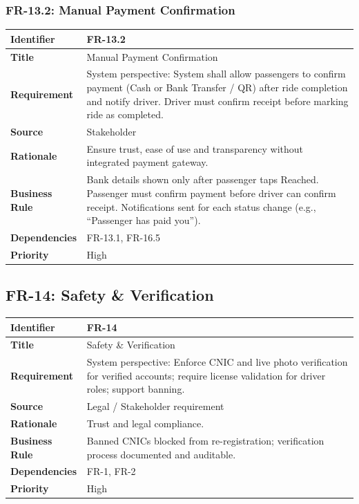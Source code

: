\subsubsection{FR-13.2: Manual Payment Confirmation}

\begin{longtable}{|p{3cm}|p{12cm}|}
\hline
\rowcolor{lightgray!30}
\textbf{Identifier} & FR-13.2 \\
\hline
\textbf{Title} & Manual Payment Confirmation \\
\hline
\textbf{Requirement} & System perspective: System shall allow passengers to confirm payment (Cash or Bank Transfer / QR) after ride completion and notify driver. Driver must confirm receipt before marking ride as completed. \\
\hline
\textbf{Source} & Stakeholder \\
\hline
\textbf{Rationale} & Ensure trust, ease of use and transparency without integrated payment gateway. \\
\hline
\textbf{Business Rule} & Bank details shown only after passenger taps Reached. Passenger must confirm payment before driver can confirm receipt. Notifications sent for each status change (e.g., “Passenger has paid you”). \\
\hline
\textbf{Dependencies} & FR-13.1, FR-16.5 \\
\hline
\textbf{Priority} & High \\
\hline
\end{longtable}

\subsection{FR-14: Safety \& Verification}

\begin{longtable}{|p{3cm}|p{12cm}|}
\hline
\rowcolor{lightgray!30}
\textbf{Identifier} & FR-14 \\
\hline
\textbf{Title} & Safety \& Verification \\
\hline
\textbf{Requirement} & System perspective: Enforce CNIC and live photo verification for verified accounts; require license validation for driver roles; support banning. \\
\hline
\textbf{Source} & Legal / Stakeholder requirement \\
\hline
\textbf{Rationale} & Trust and legal compliance. \\
\hline
\textbf{Business Rule} & Banned CNICs blocked from re-registration; verification process documented and auditable. \\
\hline
\textbf{Dependencies} & FR-1, FR-2 \\
\hline
\textbf{Priority} & High \\
\hline
\end{longtable}

